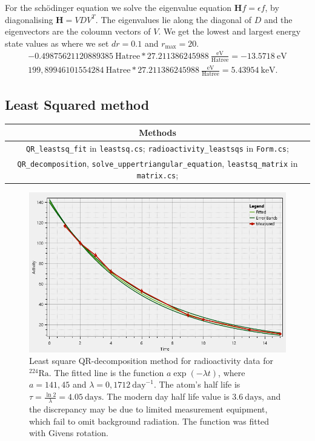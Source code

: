 \documentclass{article}
\begin{document}
For the schödinger equation we solve the eigenvalue equation $\mathbf{H}f = \epsilon f$, by diagonalising $\mathbf{H} = VDV^T$. The eigenvalues lie along the diagonal of $D$ and the eigenvectors are the coloumn vectors of $V$. We get the lowest and largest energy state values as where we set $dr = 0.1$ and $r_{\mathrm{max}} = 20$. 
{\small
\begin{align}
	-0.49875621120889385\mathrm{\ Hatree} * 27.211386245988\  \frac{\mathrm{eV}}{\mathrm{Hatree}} = -13.5718\ \mathrm{eV}\\
	199,89946101554284\mathrm{\ Hatree} * 27.211386245988\  \frac{\mathrm{eV}}{\mathrm{Hatree}} = 5.43954\ \mathrm{keV}.
\end{align}}%


\subsection{Least Squared method}
\begin{table}[H]\centering
	\begin{tabular}{|c|}
		\hline
		Methods\\\hline
		\texttt{QR\_leastsq\_fit} in \texttt{leastsq.cs}; \texttt{radioactivity\_leastsqs} in \texttt{Form.cs};
		\\
		\texttt{QR\_decomposition}, \texttt{solve\_uppertriangular\_equation}, \texttt{leastsq\_matrix} in \texttt{matrix.cs}; \\
		\hline
	\end{tabular}
\end{table}
\begin{figure}[H]
	\centering
	\includegraphics[width=.7\textwidth]{radioactivity_fit.png}
	\caption{Least square QR-decomposition method for radioactivity data for $^{224}\mathrm{Ra}$. The fitted line is the function $a\exp(-\lambda t)$, where $a = 141,45$ and $\lambda = 0,1712\ \mathrm{day}^{-1}$. The atom's half life is $\tau = \frac{\ln 2}{\lambda} =4.05\ \mathrm{days}$. The modern day half life value is $3.6\ \mathrm{days}$, and the discrepancy may be due to limited measurement equipment, which fail to omit background radiation. The function was fitted with Givens rotation.}
\end{figure}
\end{document}
